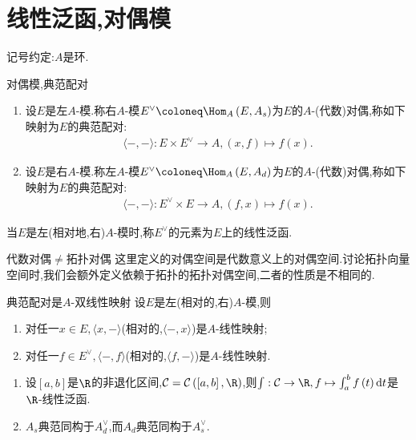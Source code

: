 \section{线性泛函,对偶模}

记号约定:$A$是环.

\begin{definition}{对偶模,典范配对}{}
	\begin{enumerate}
		\item 设$E$是左$A$-模.称右$A$-模$E^{\vee}\coloneq\Hom_{A}\left(E,A_{s}\right)$为$E$的$A$-(代数)对偶,称如下映射为$E$的典范配对:
		\begin{align*}
			\langle -,-\rangle:E\times E^{\vee}\to A,\left(x,f\right)\mapsto f\left(x\right).
		\end{align*}
		\item 设$E$是右$A$-模.称左$A$-模$E^{\vee}\coloneq\Hom_{A}\left(E,A_{d}\right)$为$E$的$A$-(代数)对偶,称如下映射为$E$的典范配对:
		\begin{align*}
			\langle -,-\rangle:E^{\vee}\times E\to A,\left(f,x\right)\mapsto f\left(x\right).
		\end{align*}
	\end{enumerate}
	当$E$是左(相对地,右)$A$-模时,称$E^{\vee}$的元素为$E$上的线性泛函.
\end{definition}

\begin{remark}{代数对偶$\neq$拓扑对偶}{}
	这里定义的对偶空间是代数意义上的对偶空间.讨论拓扑向量空间时,我们会额外定义依赖于拓扑的拓扑对偶空间,二者的性质是不相同的.
\end{remark}

\begin{proposition}{典范配对是$A$-双线性映射}{}
	设$E$是左(相对的,右)$A$-模,则
	\begin{enumerate}
		\item 对任一$x\in E,\langle x,-\rangle$(相对的,$\langle -,x\rangle$)是$A$-线性映射;
		\item 对任一$f\in E^{\vee},\langle -,f\rangle$(相对的,$\langle f,-\rangle$)是$A$-线性映射.
	\end{enumerate}
\end{proposition}

\begin{example}{}{}
	\begin{enumerate}
		\item 设$\left[a,b\right]$是$\R$的非退化区间,$\mathcal{C}=\mathcal{C}\left(\left[a,b\right],\R\right)$,则$\int:\mathcal{C}\to\R,f\mapsto\int_{a}^{b}f\left(t\right)\mathrm{d}t$是$\R$-线性泛函.
		\item $A_{s}$典范同构于$A_{d}^{\vee}$,而$A_{d}$典范同构于$A_{s}^{\vee}$.
	\end{enumerate}
\end{example}



